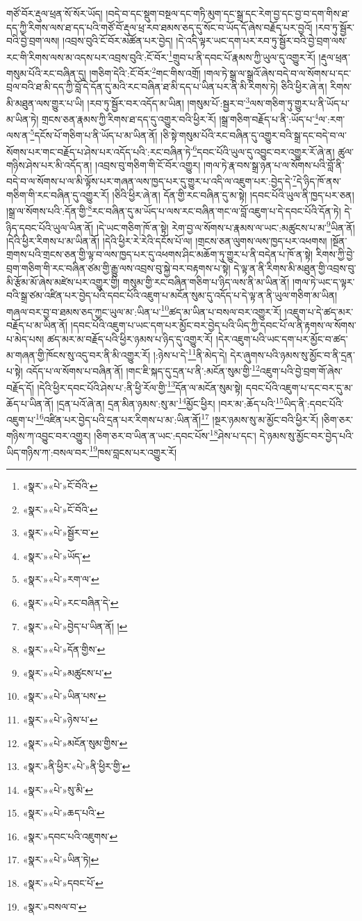 གཙོ་བོར་རྡུལ་ཕྲན་སོ་སོར་ཡོད། །བདེ་བ་དང་སྡུག་བསྔལ་དང་གཏི་མུག་དང་སྒྲ་དང་རེག་བྱ་དང་བྱ་བ་དག་གིས་ཐ་དད་ཀྱི་རིགས་ལས་ཐ་དད་པའི་གཙོ་བོ་རྡུལ་ཕྲ་རབ་ཐམས་ཅད་དུ་སོང་བ་ཡོད་དོ་ཞེས་བརྗོད་པར་བྱའོ། །རབ་ཏུ་སྦྱོར་བའི་བྱེ་བྲག་ལས། །འབྲས་བུའི་ངོ་བོར་མཚོན་པར་བྱེད། །དེ་འདི་ལྟར་ཡང་དག་པར་རབ་ཏུ་སྦྱོར་བའི་བྱེ་བྲག་ལས་རང་གི་རིགས་ལས་མ་འདས་པར་འབྲས་བུའི་:ངོ་བོར་\footnote{«སྣར་»«པེ་»ངོ་བོའི་}གྲུབ་པ་ནི་དབང་པོ་རྣམས་ཀྱི་ཡུལ་དུ་འགྱུར་རོ། །རྡུལ་ཕྲན་གསུམ་པོའི་རང་བཞིན་དུ། །གཅིག་དེའི་:ངོ་བོར་\footnote{«སྣར་»«པེ་»ངོ་བོའི་}གང་གིས་འགྲོ། །གལ་ཏེ་སྒྲ་ལ་སྒྲའོ་ཞེས་བདེ་བ་ལ་སོགས་པ་དང་བྲལ་བའི་ཐ་མི་དད་ཀྱི་བློ་དེ་དོན་དུ་མའི་རང་བཞིན་ཐ་མི་དད་པ་ཡིན་པར་ནི་མི་རིགས་ཏེ། ཅིའི་ཕྱིར་ཞེ་ན། རིགས་མི་མཐུན་ལས་གྱུར་པ་ཡི། །རབ་ཏུ་སྦྱོར་བར་འདོད་མ་ཡིན། །གསུམ་པོ་:སྦྱར་བ་\footnote{«སྣར་»«པེ་»སྦྱོར་བ་}ལས་གཅིག་ཏུ་གྱུར་པ་ནི་ཡོད་པ་མ་ཡིན་ཏེ། གྲངས་ཅན་རྣམས་ཀྱི་རིགས་ཐ་དད་དུ་འགྱུར་བའི་ཕྱིར་རོ། །སྒྲ་གཅིག་བརྗོད་པ་ནི་:ཡོད་པ་\footnote{«སྣར་»«པེ་»ཡོད་}ལ་:རག་ལས་ན་\footnote{«སྣར་»«པེ་»རག་ལ་}དངོས་པོ་གཅིག་པ་ནི་ཡོད་པ་མ་ཡིན་ནོ། །ཅི་སྟེ་གསུམ་པོའི་རང་བཞིན་དུ་འགྱུར་བའི་སྒྲ་དང་བདེ་བ་ལ་སོགས་པར་གང་བརྗོད་པ་ཤེས་པར་འདོད་པའི་:རང་བཞིན་ཏེ་\footnote{«སྣར་»«པེ་»རང་བཞིན་དེ་}དབང་པོའི་ཡུལ་དུ་འབྱུང་བར་འགྱུར་རོ་ཞེ་ན། ཚུལ་གཉིས་ཤེས་པར་མི་འདོད་ན། །འབྲས་བུ་གཅིག་གི་ངོ་བོར་འགྱུར། །གལ་ཏེ་རྣ་བས་སྒྲ་ཉན་པ་ལ་སོགས་པའི་བློ་ནི་བདེ་བ་ལ་སོགས་པ་ལ་མི་ལྟོས་པར་གཞན་ལས་ཁྱད་པར་དུ་གྱུར་པ་འདི་ལ་འཇུག་པར་:བྱེད་དེ་\footnote{«སྣར་»«པེ་»བྱེད་པ་ཡིན་ནོ། །}དེ་ཉིད་ཁོ་ནས་གཅིག་གི་རང་བཞིན་དུ་འགྱུར་རོ། །ཅིའི་ཕྱིར་ཞེ་ན། དོན་གྱི་རང་བཞིན་དུ་མ་སྟེ། །དབང་པོའི་ཡུལ་ནི་ཁྱད་པར་ཅན། །སྒྲ་ལ་སོགས་པའི་:དོན་གྱི་\footnote{«སྣར་»«པེ་»དོན་གྱིས་}རང་བཞིན་དུ་མ་ཡོད་པ་ལས་རང་བཞིན་གང་ལ་བློ་འཇུག་པ་དེ་དབང་པོའི་དོན་ཏེ། དེ་ཉིད་དབང་པོའི་ཡུལ་ཡིན་ནོ། །དེ་ཡང་གཅིག་ཁོ་ན་སྟེ། རེག་བྱ་ལ་སོགས་པ་རྣམས་ལ་ཡང་:མཚུངས་པ་མ་\footnote{«སྣར་»«པེ་»མཚུངས་པ་}ཡིན་ནོ། །དེའི་ཕྱིར་རིགས་པ་མ་ཡིན་ནོ། །དེའི་ཕྱིར་རེ་རེའི་དངོས་པོ་ལ། །གྲངས་ཅན་ལུགས་ལས་ཁྱད་པར་འཕགས། །སྔོན་གྲགས་པའི་གྲངས་ཅན་གྱི་ལྟ་བ་ལས་ཁྱད་པར་དུ་འཕགས་ཤིང་མཆོག་ཏུ་གྱུར་པ་ནི་བདེན་པ་ཁོ་ན་སྟེ། རིགས་ཀྱི་བྱེ་བྲག་གཅིག་གི་རང་བཞིན་ཙམ་གྱི་རྒྱུ་ལས་འབྲས་བུ་སྐྱེ་བར་བརྟགས་པ་སྟེ། དེ་ལྟ་ན་ནི་རིགས་མི་མཐུན་གྱི་འབྲས་བུ་མི་རྩོམ་མོ་ཞེས་མཛེས་པར་འགྱུར་གྱི། གསུམ་གྱི་རང་བཞིན་གཅིག་པ་ཉིད་ལས་ནི་མ་ཡིན་ནོ། །གལ་ཏེ་ཡང་ད་ལྟར་བའི་སྒྲ་ཙམ་འཛིན་པར་བྱེད་པའི་དབང་པོའི་འཇུག་པ་མངོན་སུམ་དུ་འདོད་པ་དེ་ལྟ་ན་ནི་ཡུལ་གཅིག་མ་ཡིན། གཞལ་བར་བྱ་བ་ཐམས་ཅད་ཀྱང་ཡུལ་མ་:ཡིན་པ་\footnote{«སྣར་»«པེ་»ཡིན་པས་}ཚད་མ་ཡིན་པ་བསལ་བར་འགྱུར་རོ། །འཇུག་པ་དེ་ཚད་མར་བརྗོད་པ་མ་ཡིན་ནོ། །དབང་པོའི་འཇུག་པ་ཡང་དག་པར་མྱོང་བར་བྱེད་པའི་ཡིད་ཀྱི་དབང་པོ་ལ་ནི་རྟགས་ལ་སོགས་པ་མེད་པས། ཚད་མར་མ་བརྗོད་པའི་ཕྱིར་ཉམས་པ་ཉིད་དུ་འགྱུར་རོ། །དེར་འཇུག་པའི་ཡང་དག་པར་མྱོང་བ་ཚད་མ་གཞན་གྱི་ཁོངས་སུ་འདུ་བར་ནི་མི་འགྱུར་རོ། །:ཉེས་པ་དེ་\footnote{«སྣར་»«པེ་»ཉེས་པ་}ནི་མེད་དེ། དེར་ཞུགས་པའི་ཉམས་སུ་མྱོང་བ་ནི་དྲན་པ་སྟེ། འདོད་པ་ལ་སོགས་པ་བཞིན་ནོ། །གང་ཇི་སྐད་དུ་དྲན་པ་ནི་:མངོན་སུམ་གྱི་\footnote{«སྣར་»«པེ་»མངོན་སུམ་གྱིས་}འཇུག་པའི་བྱེ་བྲག་གོ་ཞེས་བརྗོད་དོ། །དེའི་ཕྱིར་དབང་པོའི་ཤེས་པ་:ནི་ཕྱི་རོལ་གྱི་\footnote{«སྣར་»ནི་ཕྱིར་«པེ་»ནི་ཕྱིར་གྱི་}དོན་ལ་མངོན་སུམ་སྟེ། དབང་པོའི་འཇུག་པ་དང་བར་དུ་མ་ཆོད་པ་ཡིན་ནོ། །དྲན་པའོ་ཞེ་ན། དྲན་མིན་ཉམས་:སུ་མ་\footnote{«སྣར་»«པེ་»སུ་མི་}མྱོང་ཕྱིར། །བར་མ་:ཆོད་པའི་\footnote{«སྣར་»«པེ་»ཆད་པའི་}ཡིད་ནི་:དབང་པོའི་འཇུག་པ་\footnote{«སྣར་»དབང་པའི་འཇུགས་}འཛིན་པར་བྱེད་པའི་དྲན་པར་རིགས་པ་མ་:ཡིན་ནོ།\footnote{«སྣར་»«པེ་»ཡིན་ཏེ།} །སྔར་ཉམས་སུ་མ་མྱོང་བའི་ཕྱིར་རོ། །ཅིག་ཅར་གཉིས་ཀ་འབྱུང་བར་འགྱུར། །ཅིག་ཅར་བ་ཡིན་ན་ཡང་:དབང་པོས་\footnote{«སྣར་»«པེ་»དབང་པོ་}ཤེས་པ་དང་། དེ་ཉམས་སུ་མྱོང་བར་བྱེད་པའི་ཡིད་གཉིས་ཀ་:བསལ་བར་\footnote{«སྣར་»བསལ་བ་}ཁས་བླངས་པར་འགྱུར་རོ། 